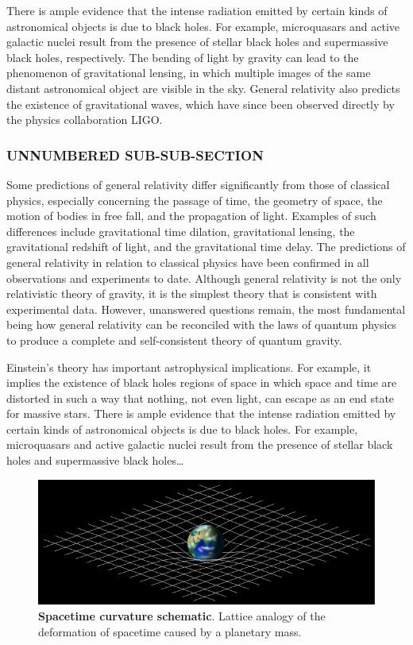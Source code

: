 There is ample evidence that the intense radiation
emitted by certain kinds of astronomical objects is due to black holes. For
example, microquasars and active galactic nuclei result from the presence of
stellar black holes and supermassive black holes, respectively. The bending of
light by gravity can lead to the phenomenon of gravitational lensing, in which
multiple images of the same distant astronomical object are visible in the sky.
General relativity also predicts the existence of gravitational waves, which
have since been observed directly by the physics collaboration LIGO.
\subsubsection*{UNNUMBERED SUB-SUB-SECTION}
Some predictions of general relativity differ significantly from those of
classical physics, especially concerning the passage of time, the geometry of
space, the motion of bodies in free fall, and the propagation of light. Examples
of such differences include gravitational time dilation, gravitational lensing,
the gravitational redshift of light, and the gravitational time delay. The
predictions of general relativity in relation to classical physics have been
confirmed in all observations and experiments to date. Although general
relativity is not the only relativistic theory of gravity, it is the simplest
theory that is consistent with experimental data. However, unanswered questions
remain, the most fundamental being how general relativity can be reconciled with
the laws of quantum physics to produce a complete and self-consistent theory of
quantum gravity.

Einstein's theory has important astrophysical implications. For example, it
implies the existence of black holes regions of space in which space and time
are distorted in such a way that nothing, not even light, can escape as an
end state for massive stars. There is ample evidence that the intense radiation
emitted by certain kinds of astronomical objects is due to black holes. For
example, microquasars and active galactic nuclei result from the presence of
stellar black holes and supermassive black holes\ldots


\vfill\null

\begin{figure}[b]
\begin{center}
\includegraphics[width=.47\textwidth]{img/image1.png}
\caption{\textbf{Spacetime curvature schematic}. Lattice analogy of the deformation
of spacetime caused by a planetary mass.}
\label{gr01}
\end{center}
\end{figure}

